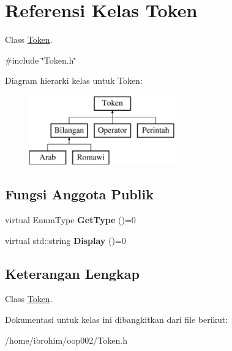 \hypertarget{classToken}{}\section{Referensi Kelas Token}
\label{classToken}


Class \hyperlink{classToken}{Token}.  




{\ttfamily \#include \char`\"{}Token.\+h\char`\"{}}

Diagram hierarki kelas untuk Token\+:\begin{figure}[H]
\begin{center}
\leavevmode
\includegraphics[height=3.000000cm]{d2/d6e/classToken}
\end{center}
\end{figure}
\subsection*{Fungsi Anggota Publik}
\begin{DoxyCompactItemize}
\item 
\hypertarget{classToken_a86f97e77bdba8277b58ead29d3ef3584}{}virtual Enum\+Type {\bfseries Get\+Type} ()=0\label{classToken_a86f97e77bdba8277b58ead29d3ef3584}

\item 
\hypertarget{classToken_a89fa3f496f16d14fcf4b4f1a4047229b}{}virtual std\+::string {\bfseries Display} ()=0\label{classToken_a89fa3f496f16d14fcf4b4f1a4047229b}

\end{DoxyCompactItemize}


\subsection{Keterangan Lengkap}
Class \hyperlink{classToken}{Token}. 

Dokumentasi untuk kelas ini dibangkitkan dari file berikut\+:\begin{DoxyCompactItemize}
\item 
/home/ibrohim/oop002/Token.\+h\end{DoxyCompactItemize}
